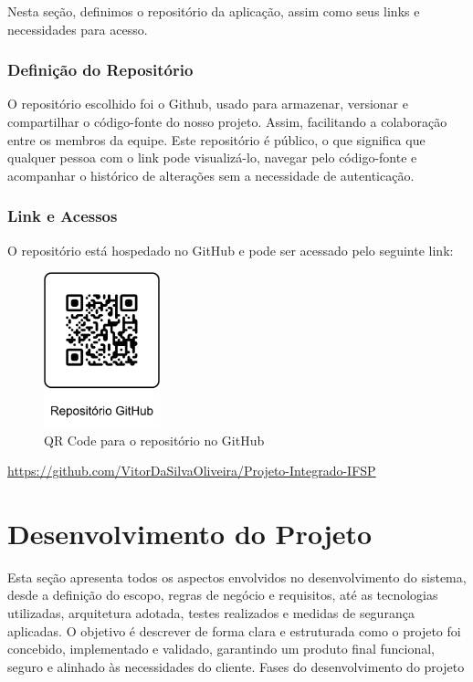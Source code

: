 \documentclass[
	12pt,				%
	openany,			%
	twoside,			%
	a4paper,			%
	english,			%
	brazil				%
	]{abntex2}
\begin{document}
Nesta seção, definimos o repositório da aplicação, assim como seus links e necessidades para acesso.

\subsection{Definição do Repositório}

O repositório escolhido foi o Github, usado para armazenar, versionar e compartilhar o código-fonte do nosso projeto. Assim, facilitando a colaboração entre os membros da equipe. Este repositório é público, o que significa que qualquer pessoa com o link pode visualizá-lo, navegar pelo código-fonte e acompanhar o histórico de alterações sem a necessidade de autenticação.

\subsection{Link e Acessos}

O repositório está hospedado no GitHub e pode ser acessado pelo seguinte link:

\begin{figure}[h!]
    \centering
    \includegraphics[width=0.3\textwidth]{Figuras/QR-CODE-GitHub.png}
    \caption{QR Code para o repositório no GitHub}
\end{figure}

\begin{center}
    \href{https://github.com/VitorDaSilvaOliveira/Projeto-Integrado-IFSP}{https://github.com/VitorDaSilvaOliveira/Projeto-Integrado-IFSP}
\end{center}

\chapter{Desenvolvimento do Projeto}

Esta seção apresenta todos os aspectos envolvidos no desenvolvimento do sistema, desde a definição do escopo, regras de negócio e requisitos, até as tecnologias utilizadas, arquitetura adotada, testes realizados e medidas de segurança aplicadas. O objetivo é descrever de forma clara e estruturada como o projeto foi concebido, implementado e validado, garantindo um produto final funcional, seguro e alinhado às necessidades do cliente.
Fases do desenvolvimento do projeto
\end{document}
